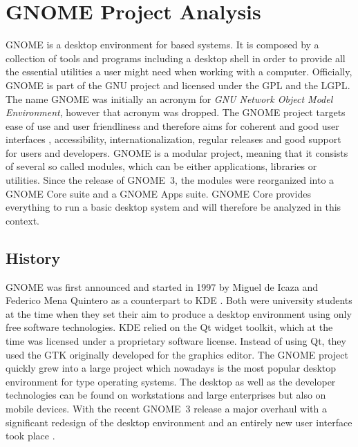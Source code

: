 \section{GNOME Project Analysis} %


\noindent GNOME is a desktop environment for  based systems.
It is composed by a collection of tools and programs including a desktop shell
in order to provide all the essential utilities a user might need when working
with a computer. Officially, GNOME is part of the \ac{GNU} project and licensed
under the \ac{GPL} and the \ac{LGPL}. The name GNOME was initially an acronym
for \emph{GNU Network Object Model Environment}, however that acronym was
dropped. The GNOME project targets ease of use and user friendliness and
therefore aims for coherent and good user interfaces \cite{GNOMEHIG},
accessibility, internationalization, regular releases and good support for
users and developers. GNOME is a modular project, meaning that it consists of
several so called modules, which can be either applications, libraries or
utilities. Since the release of GNOME~3, the modules were reorganized into a
GNOME Core suite and a GNOME Apps suite. GNOME Core provides everything to run
a basic desktop system and will therefore be analyzed in this context.

\subsection{History} %

GNOME was first announced and started in 1997 by Miguel de Icaza and Federico
Mena Quintero as a counterpart to KDE
\cite{German2003,GNOMEAbout,GNOMEAnnouncement}. Both were university students
at the time when they set their aim to produce a desktop environment using only
free software technologies. KDE relied on the Qt widget toolkit, which at the
time was licensed under a proprietary software license. Instead of using Qt,
they used the \ac{GTK} originally developed for the  graphics
editor. The GNOME project quickly grew into a large project which nowadays is
the most popular desktop environment for  type operating
systems. The desktop as well as the developer technologies can be found on
workstations and large enterprises but also on mobile devices. With the recent
GNOME~3 release a major overhaul with a significant redesign of the desktop
environment and an entirely new user interface took place \cite{GNOMEPress}.

